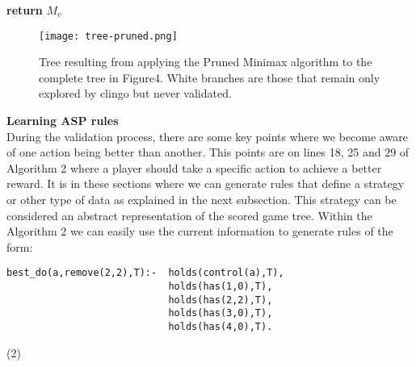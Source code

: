 \begin{algorithm}
\begin{algorithmic}[1]

            \EndIf 
          \EndIf 
        \EndFor
        \State \textbf{return} $M_v$ 
      \EndFunction
        
    \end{algorithmic}
\end{algorithm}

\begin{figure}[H]
\centering
  \texttt{[image: tree-pruned.png]}
  \caption{Tree resulting from applying the Pruned Minimax algorithm to the complete tree in Figure4. White branches are those that remain only explored by clingo but never validated.}
\end{figure}

\vspace{10px}
\textbf{Learning ASP rules}\\

During the validation process, there are some key points where we become aware of one action being better than another. This points are on lines 18, 25 and 29 of Algorithm 2 where a player should take a specific action to achieve a better reward. It is in these sections where we can generate rules that define a strategy or other type of data as explained in the next subsection. This strategy can be considered an abstract representation of the scored game tree. Within the Algorithm 2 we can easily use the current information to generate rules of the form:

\vspace{30px}

\begin{minipage}{0.90\textwidth}
  \vspace{5px}
  \begin{verbatim}
best_do(a,remove(2,2),T):-  holds(control(a),T),
                            holds(has(1,0),T), 
                            holds(has(2,2),T),
                            holds(has(3,0),T),
                            holds(has(4,0),T).
  \end{verbatim}
  \hfill
\end{minipage}
\begin{minipage}{0.05\textwidth}
  \hfill (2)
  \vspace{30px}
\end{minipage}

